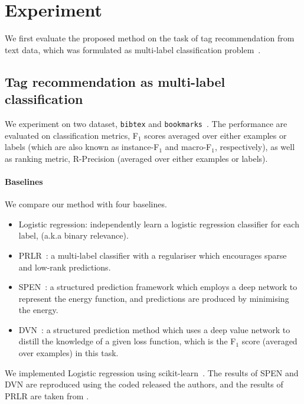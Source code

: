 \clearpage
\newpage

\section{Experiment}
\label{sec:experiment}

We first evaluate the proposed method on the task of tag recommendation from text data,
which was formulated as multi-label classification problem~\cite{katakis2008multilabel}.

\subsection{Tag recommendation as multi-label classification}

We experiment on two dataset, \texttt{bibtex} and \texttt{bookmarks}~\cite{katakis2008multilabel}.
The performance are evaluated on classification metrics, \ie F$_1$ scores averaged over either examples or labels 
(which are also known as instance-F$_1$ and macro-F$_1$, respectively),
as well as ranking metric, \ie R-Precision (averaged over either examples or labels).

\paragraph{Baselines}
We compare our method with four baselines.
\begin{itemize}
\item Logistic regression: independently learn a logistic regression classifier for each label, (a.k.a binary relevance).
\item PRLR~\cite{lin2014multi}: a multi-label classifier with a regulariser which encourages sparse and low-rank predictions.
\item SPEN~\cite{belanger2016structured}: a structured prediction framework which employs a deep network to represent the energy function,
      and predictions are produced by minimising the energy.
\item DVN~\cite{gygli2017deep}: a structured prediction method which uses a deep value network to distill the knowledge of a given loss function,
      which is the F$_1$ score (averaged over examples) in this task.
\end{itemize}

We implemented Logistic regression using scikit-learn~\cite{}.
The results of SPEN and DVN are reproduced using the coded released the authors,
and the results of PRLR are taken from \cite{lin2014multi}.

